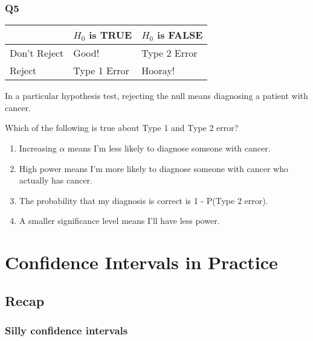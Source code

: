 \documentclass[
  letterpaper,
  DIV=11,
  numbers=noendperiod]{scrreprt}
\providecommand{\tightlist}{%
  \setlength{\itemsep}{0pt}\setlength{\parskip}{0pt}}\usepackage{longtable,booktabs,array}
\def\pspace{}
\begin{document}
\hypertarget{q5-1}{%
\subsection{Q5}\label{q5-1}}

\begin{longtable}[]{@{}lll@{}}
\toprule\noalign{}
& \(H_0\) is TRUE & \(H_0\) is FALSE \\
\midrule\noalign{}
\endhead
\bottomrule\noalign{}
\endlastfoot
Don't Reject & Good! & Type 2 Error \\
Reject & Type 1 Error & Hooray! \\
\end{longtable}

In a particular hypothesis test, rejecting the null means diagnosing a
patient with cancer.

Which of the following is true about Type 1 and Type 2 error?

\pspace

\begin{enumerate}
\def\labelenumi{\arabic{enumi}.}
\tightlist
\item
  Increasing \(\alpha\) means I'm less likely to diagnose someone with
  cancer.
\item
  High power means I'm more likely to diagnose someone with cancer who
  actually has cancer.
\item
  The probability that my diagnosis is correct is 1 - P(Type 2 error).
\item
  A smaller significance level means I'll have less power.
\end{enumerate}

\hypertarget{confidence-intervals-in-practice}{%
\chapter{Confidence Intervals in
Practice}\label{confidence-intervals-in-practice}}

\hypertarget{recap}{%
\section{Recap}\label{recap}}

\hypertarget{silly-confidence-intervals}{%
\subsection{Silly confidence
intervals}\label{silly-confidence-intervals}}
\end{document}
